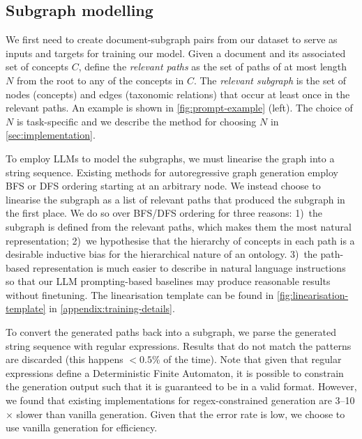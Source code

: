 \subsection{Subgraph modelling}  \label{sec:method:subgraph}



We first need to create document-subgraph pairs from our dataset to serve as inputs and targets for training our model. Given a document and its associated set of concepts $C$, define the \emph{relevant paths} as the set of paths of at most length $N$ from the root to any of the concepts in $C$. The \emph{relevant subgraph} is the set of nodes (concepts) and edges (taxonomic relations) that occur at least once in the relevant paths. An example is shown in \cref{fig:prompt-example} (left). The choice of $N$ is task-specific and we describe the method for choosing $N$ in \cref{sec:implementation}.

To employ LLMs to model the subgraphs, we must linearise the graph into a string sequence. Existing methods for autoregressive graph generation employ BFS \cite{you2018graphrnn} or DFS \cite{goyal2020graphgen} ordering starting at an arbitrary node. We instead choose to linearise the subgraph as a list of relevant paths that produced the subgraph in the first place. We do so over BFS/DFS ordering for three reasons: 1)~the subgraph is defined from the relevant paths, which makes them the most natural representation; 2)~we hypothesise that the hierarchy of concepts in each path is a desirable inductive bias for the hierarchical nature of an ontology. 3)~the path-based representation is much easier to describe in natural language instructions so that our LLM prompting-based baselines may produce reasonable results without finetuning. The linearisation template can be found in \cref{fig:linearisation-template} in \cref{appendix:training-details}.

To convert the generated paths back into a subgraph, we parse the generated string sequence with regular expressions. Results that do not match the patterns are discarded (this happens $< 0.5\%$ of the time). Note that given that regular expressions define a Deterministic Finite Automaton, it is possible to constrain the generation output such that it is guaranteed to be in a valid format. However, we found that existing implementations \cite{willard2023efficient} for regex-constrained generation are 3--10$\times$ slower than vanilla generation. Given that the error rate is low, we choose to use vanilla generation for efficiency.


